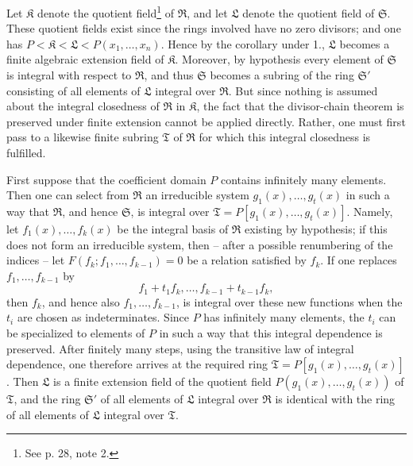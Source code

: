 \documentclass[11pt]{article}
\begin{document}
Let $\mathfrak K$ denote the quotient field\footnote{See p. 28, note 2.} of $\mathfrak R$, and let $\mathfrak L$ denote the quotient field of $\mathfrak S$. These quotient fields exist since the rings involved have no zero divisors; and one has $P<\mathfrak K<\mathfrak L<P(x_1,\ldots,x_n)$. Hence by the corollary under 1., $\mathfrak L$ becomes a finite algebraic extension field of $\mathfrak K$. Moreover, by hypothesis every element of $\mathfrak S$ is integral with respect to $\mathfrak R$, and thus $\mathfrak S$ becomes a subring of the ring $\mathfrak S'$ consisting of all elements of $\mathfrak L$ integral over $\mathfrak R$. But since nothing is assumed about the integral closedness of $\mathfrak R$ in $\mathfrak K$, the fact that the divisor-chain theorem is preserved under finite extension cannot be applied directly. Rather, one must first pass to a likewise finite subring $\mathfrak T$ of $\mathfrak R$ for which this integral closedness is fulfilled.

First suppose that the coefficient domain $P$ contains infinitely many elements. Then one can select from $\mathfrak R$ an irreducible system $g_1(x),\ldots,g_t(x)$ in such a way that $\mathfrak R$, and hence $\mathfrak S$, is integral over $\mathfrak T=P[g_1(x),\ldots,g_t(x)]$. Namely, let $f_1(x),\ldots,f_k(x)$ be the integral basis of $\mathfrak R$ existing by hypothesis; if this does not form an irreducible system, then -- after a possible renumbering of the indices -- let $F(f_k;f_1,
\ldots,f_{k-1})=0$ be a relation satisfied by $f_k$. If one replaces $f_1,
\ldots,f_{k-1}$ by
\[
 f_1+t_1f_k,\ldots,f_{k-1}+t_{k-1}f_k,
\]
then $f_k$, and hence also $f_1,
\ldots,f_{k-1}$, is integral over these new functions when the $t_i$ are chosen as indeterminates. Since $P$ has infinitely many elements, the $t_i$ can be specialized to elements of $P$ in such a way that this integral dependence is preserved. After finitely many steps, using the transitive law of integral dependence, one therefore arrives at the required ring $\mathfrak T=P[g_1(x),\ldots,g_t(x)]$. Then $\mathfrak L$ is a finite extension field of the quotient field $P(g_1(x),\ldots,g_t(x))$ of $\mathfrak T$, and the ring $\mathfrak S'$ of all elements of $\mathfrak L$ integral over $\mathfrak R$ is identical with the ring of all elements of $\mathfrak L$ integral over $\mathfrak T$.
\end{document}
